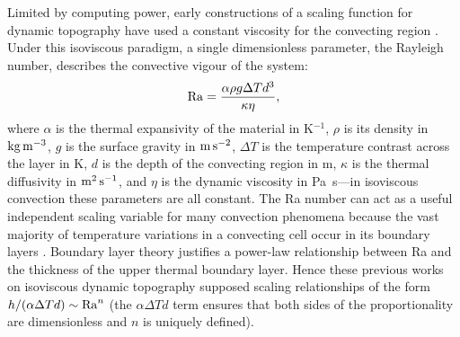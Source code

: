 Limited by computing power, early constructions of a scaling function for dynamic topography have used a constant viscosity for the convecting region \citep{parsons_relationship_1983, kiefer_geoid_1992}. Under this isoviscous paradigm, a single dimensionless parameter, the Rayleigh number, describes the convective vigour of the system:
\begin{equation}\label{eq:Ra}
    {\rm Ra} = \frac{\alpha\rho g \Delta T d^3}{\kappa \eta},
\end{equation}
where $\alpha$ is the thermal expansivity of the material in K$^{-1}$, $\rho$ is its density in ${\rm kg\,m^{-3}}$, $g$ is the surface gravity in ${\rm m\,s^{-2}}$, $\Delta T$ is the temperature contrast across the layer in K, $d$ is the depth of the convecting region in m, $\kappa$ is the thermal diffusivity in ${\rm m^2\,s^{-1}}$, and $\eta$ is the dynamic viscosity in Pa~s---in isoviscous convection these parameters are all constant. The Ra number can act as a useful independent scaling variable for many convection phenomena because the vast majority of temperature variations in a convecting cell occur in its boundary layers \citep{mckenzie_convection_1974}. Boundary layer theory justifies a power-law relationship between Ra and the thickness of the upper thermal boundary layer. Hence these previous works on isoviscous dynamic topography supposed scaling relationships of the form $h/(\alpha \Delta T d) \sim {\rm Ra}^n$ (the $\alpha \Delta T d$ term ensures that both sides of the proportionality are dimensionless and $n$ is uniquely defined). %

